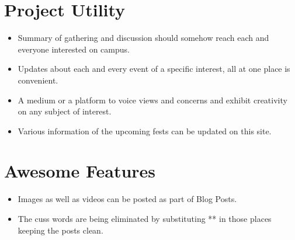 \documentclass[oneside,a4paper,12pt]{article}
\begin{document}
\newpage
\section{Project Utility}
\begin{itemize}
\item Summary of gathering and discussion should somehow reach each and everyone interested on campus.
\item Updates about each and every event of a specific interest, all at one place is convenient.
\item A medium or a platform to voice views and concerns and exhibit creativity on any subject of interest.
\item Various information of the upcoming fests can be updated on this site.
\end{itemize}
\section{Awesome Features}
\begin{itemize}
    \item Images as well as videos can be posted as part of Blog Posts.
    \item The cuss words are being eliminated by substituting ** in those places keeping the posts clean.
\end{itemize}
\end{document}

